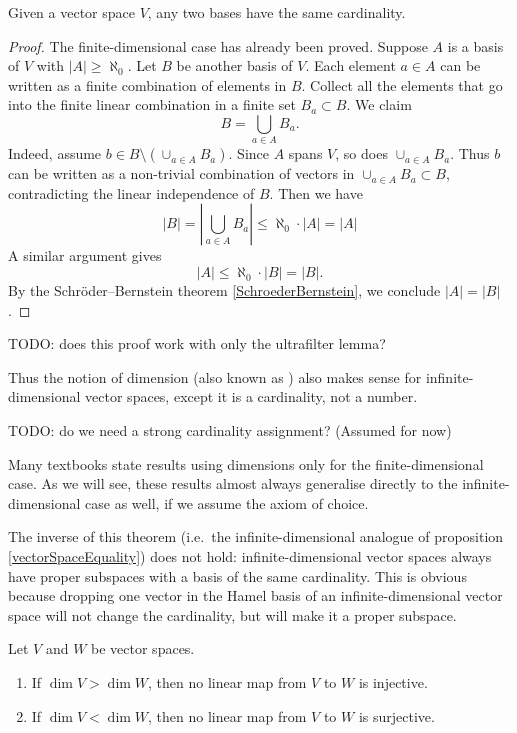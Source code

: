\begin{theorem}
Given a vector space $V$, any two bases have the same cardinality.
\end{theorem}
\begin{proof}
The finite-dimensional case has already been proved. Suppose $A$ is a basis of $V$ with $|A| \geq \aleph_0$. Let $B$ be another basis of $V$. Each element $a\in A$ can be written as a finite combination of elements in $B$. Collect all the elements that go into the finite linear combination in a finite set $B_a \subset B$. We claim
\[ B = \bigcup_{a\in A} B_a. \]
Indeed, assume $b\in B \setminus (\cup_{a\in A} B_a)$. Since $A$ spans $V$, so does $\cup_{a\in A} B_a$. Thus $b$ can be written as a non-trivial combination of vectors in $\cup_{a\in A} B_a\subset B$, contradicting the linear independence of $B$. Then we have
\[ |B| = \left| \bigcup_{a\in A}B_a \right| \leq \aleph_0 \cdot |A| = |A| \]
A similar argument gives
\[ |A| \leq \aleph_0 \cdot |B| = |B|. \]
By the Schröder–Bernstein theorem \ref{SchroederBernstein}, we conclude $|A| = |B|$.
\end{proof}
TODO: does this proof work with only the ultrafilter lemma?

Thus the notion of dimension (also known as ) also makes sense for infinite-dimensional vector spaces, except it is a cardinality, not a number.

TODO: do we need a strong cardinality assignment? (Assumed for now)

Many textbooks state results using dimensions only for the finite-dimensional case. As we will see, these results almost always generalise directly to the infinite-dimensional case as well, if we assume the axiom of choice.

\begin{note}
The inverse of this theorem (i.e.\ the infinite-dimensional analogue of proposition \ref{vectorSpaceEquality}) does not hold: infinite-dimensional vector spaces always have proper subspaces with a basis of the same cardinality. This is obvious because dropping one vector in the Hamel basis of an infinite-dimensional vector space will not change the cardinality, but will make it a proper subspace.
\end{note}

 \begin{corollary}
 Let $V$ and $W$ be vector spaces.
 \begin{enumerate}
 \item If $\dim V > \dim W$, then no linear map from $V$ to $W$ is injective.
 \item If $\dim V < \dim W$, then no linear map from $V$ to $W$ is surjective.
 \end{enumerate}
 \end{corollary}

